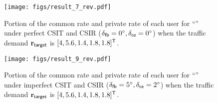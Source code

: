 \documentclass[draftclsnofoot, onecolumn, comsoc, 12pt]{IEEEtran}
\begin{document}
\begin{figure}[!t]
\centering
 		\texttt{[image: figs/result\_7\_rev.pdf]}
 		\caption{{Portion of the common rate and private rate of each user for ``{}'' under perfect CSIT and CSIR ($\delta_{\sf{fb}}=0^{\circ}, \delta_{\sf{ce}}=0^{\circ}$) when the traffic demand $\mathbf{r}_{\sf{target}}$ is $[4, 5.6, 1.4, 1.8, 1.8]^{\sf{T}}$.}}
    	\label{result_8} %
\end{figure}

\begin{figure}[!t]
\centering
 		\texttt{[image: figs/result\_9\_rev.pdf]}
 		\caption{{Portion of the common rate and private rate of each user for ``{}''  under imperfect CSIT and CSIR ($\delta_{\sf{fb}}=5^{\circ}, \delta_{\sf{ce}}=2^{\circ}$) when the traffic demand $\mathbf{r}_{\sf{target}}$ is $[4, 5.6, 1.4, 1.8, 1.8]^{\sf{T}}$.}}
    	\label{result_10} %
\end{figure}
\end{document}
